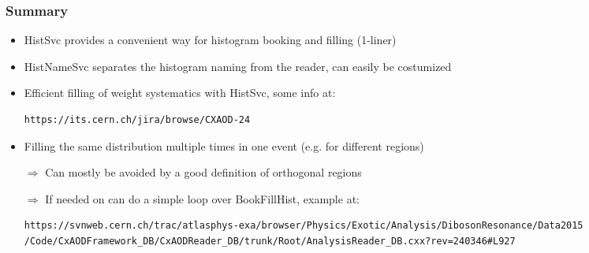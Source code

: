 \documentclass{beamer}
\begin{document}
\begin{frame}[fragile]
\frametitle{Summary}
\begin{itemize}
 \item HistSvc provides a convenient way for histogram booking and filling (1-liner)
 \item HistNameSvc separates the histogram naming from the reader, can easily be costumized
\end{itemize}
\begin{itemize}
 \item Efficient filling of weight systematics with HistSvc, some info at:
{\tiny
\begin{verbatim}
https://its.cern.ch/jira/browse/CXAOD-24
\end{verbatim}
}
 \item Filling the same distribution multiple times in one event (e.g. for different regions)
 \item[$\Rightarrow$] Can mostly be avoided by a good definition of orthogonal regions
 \item[$\Rightarrow$] If needed on can do a simple loop over BookFillHist, example at:
{\tiny
\begin{verbatim}
https://svnweb.cern.ch/trac/atlasphys-exa/browser/Physics/Exotic/Analysis/DibosonResonance/Data2015
/Code/CxAODFramework_DB/CxAODReader_DB/trunk/Root/AnalysisReader_DB.cxx?rev=240346#L927
\end{verbatim}
}
\end{itemize}
\end{frame}

% 
\end{document}
